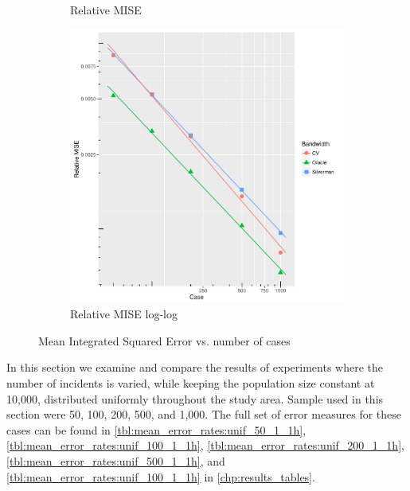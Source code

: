 \begin{figure}[htbp]
\begin{subfigure}[b]{0.3\textwidth}
    \caption{Relative MISE}
    \label{fig:ise:unif_NCases_1h:b}
    \end{subfigure}
    \begin{subfigure}[b]{0.3\textwidth}
    \includegraphics[width=\textwidth]{results/by_num_cases/RMISE-vs-cases-log-log}
    \caption{Relative MISE log-log}
    \label{fig:ise:unif_NCases_1h:c}
    \end{subfigure}
    \caption[MISE: by number of cases]{Mean Integrated Squared Error vs. number of cases}
    \label{fig:ise:unif_NCases_1h}
\end{figure}

In this section we examine and compare the results of experiments where the number of incidents is varied, while keeping the population size constant at 10,000, distributed uniformly throughout the study area.
Sample used in this section were 50, 100, 200, 500, and 1,000.
The full set of error measures for these cases can be found in \autoref{tbl:mean_error_rates:unif_50_1_1h}, \autoref{tbl:mean_error_rates:unif_100_1_1h}, \autoref{tbl:mean_error_rates:unif_200_1_1h}, \autoref{tbl:mean_error_rates:unif_500_1_1h}, and \autoref{tbl:mean_error_rates:unif_100_1_1h} in \autoref{chp:results_tables}.

